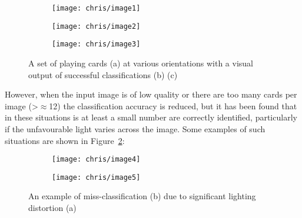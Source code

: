 		\begin{figure}[H]
			\centering
			\begin{subfigure}[b]{\textwidth}
				\centering
				\texttt{[image: chris/image1]}
				\caption{}
			\end{subfigure}
		\end{figure}
		\begin{figure}[H]
			\ContinuedFloat
			\centering
			\begin{subfigure}[b]{\textwidth}
				\centering
				\texttt{[image: chris/image2]}
				\caption{}
			\end{subfigure}
		\end{figure}
		\begin{figure}[H]
			\ContinuedFloat
			\centering
			\begin{subfigure}[b]{\textwidth}
				\centering
				\texttt{[image: chris/image3]}
				\caption{}
			\end{subfigure}
			\caption{A set of playing cards (a) at various orientations with a visual output of successful classifications (b) (c)}
			\label{fig:success}
		\end{figure}

		However, when the input image is of low quality or there are too many cards per image (\textgreater $\approx$12) the classification accuracy is reduced, but it has been found that in these situations is at least a small number are correctly identified, particularly if the unfavourable light varies across the image. Some examples of such situations are shown in Figure~\ref{fig:fail}:

		\begin{figure}[H]
			\centering
			\begin{subfigure}[b]{\textwidth}
				\centering
				\texttt{[image: chris/image4]}
				\caption{}
			\end{subfigure}
		\end{figure}
		\begin{figure}[H]
			\ContinuedFloat
			\centering
			\begin{subfigure}[b]{\textwidth}
				\centering
				\texttt{[image: chris/image5]}
				\caption{}
			\end{subfigure}
			\caption{An example of miss-classification (b) due to significant lighting distortion (a)}
			\label{fig:fail}
		\end{figure}
